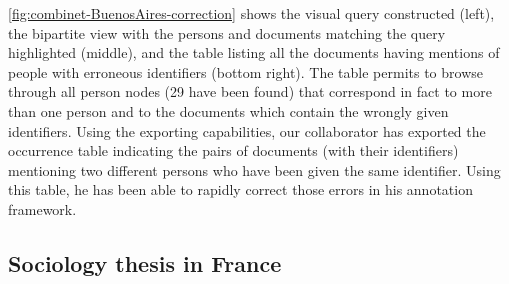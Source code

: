 \autoref{fig:combinet-BuenosAires-correction} shows the visual query constructed (left), the bipartite view with the persons and documents matching the query highlighted (middle), and the table listing all the documents having mentions of people with erroneous identifiers (bottom right).
The table permits to browse through all person nodes (29 have been found) that correspond in fact to more than one person and to the documents which contain the wrongly given identifiers.
Using the exporting capabilities, our collaborator has exported the occurrence table indicating the pairs of documents (with their identifiers) mentioning two different persons who have been given the same identifier.
Using this table, he has been able to rapidly correct those errors in his annotation framework.








\subsection{Sociology thesis in France}

